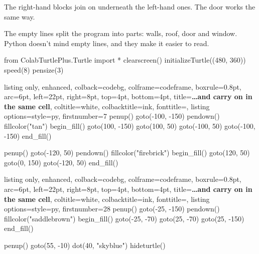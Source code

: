 The right-hand blocks join on underneath the left-hand ones. The door works the same way.

The empty lines split the program into parts: walls, roof, door and window. Python doesn't mind empty lines, and they make it easier to read.

\begin{typethis}
from ColabTurtlePlus.Turtle import *
clearscreen()
initializeTurtle((480, 360))
speed(8)
pensize(3)
\end{typethis}
\begin{tcbraster}[raster columns=2, raster column skip=10pt, raster valign=top]
\begin{tcblisting}{listing only, enhanced, colback=codebg, colframe=codeframe, boxrule=0.8pt, arc=6pt, left=22pt, right=8pt, top=4pt, bottom=4pt, title={\textbf{\ldots and carry on in the same cell}}, coltitle=white, colbacktitle=ink, fonttitle=\small, listing options={style=py, firstnumber=7}}
penup()
goto(-100, -150)
pendown()
fillcolor("tan")
begin_fill()
goto(100, -150)
goto(100, 50)
goto(-100, 50)
goto(-100, -150)
end_fill()

penup()
goto(-120, 50)
pendown()
fillcolor("firebrick")
begin_fill()
goto(120, 50)
goto(0, 150)
goto(-120, 50)
end_fill()
\end{tcblisting}
\begin{tcblisting}{listing only, enhanced, colback=codebg, colframe=codeframe, boxrule=0.8pt, arc=6pt, left=22pt, right=8pt, top=4pt, bottom=4pt, title={\textbf{\ldots and carry on in the same cell}}, coltitle=white, colbacktitle=ink, fonttitle=\small, listing options={style=py, firstnumber=28}}
penup()
goto(-25, -150)
pendown()
fillcolor("saddlebrown")
begin_fill()
goto(-25, -70)
goto(25, -70)
goto(25, -150)
end_fill()

penup()
goto(55, -10)
dot(40, "skyblue")
hideturtle()
\end{tcblisting}
\end{tcbraster}


